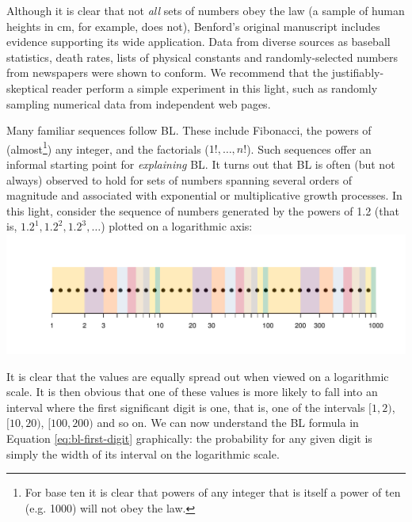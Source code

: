 \documentclass[twoside,leqno,twocolumn]{article}\usepackage[]{graphicx}\usepackage[]{color}
\makeatletter
\def\maxwidth{ %
  \ifdim\Gin@nat@width>\linewidth
    \linewidth
  \else
    \Gin@nat@width
  \fi
}
\newenvironment{knitrout}{}{} %
\makeatother
\begin{document}
Although it is clear that not \textit{all} sets of numbers obey the law (a sample of human heights in cm, for example, does not), Benford's original manuscript \cite{benford1938law} includes evidence supporting its wide application. Data from diverse sources as baseball statistics, death rates, lists of physical constants and randomly-selected numbers from newspapers were shown to conform. We recommend that the justifiably-skeptical reader perform a simple experiment in this light, such as randomly sampling numerical data from independent web pages.

Many familiar sequences follow BL. These include Fibonacci, the powers of (almost\footnote{For base ten it is clear that powers of any integer that is itself a power of ten (e.g. 1000) will not obey the law.}) any integer, and the factorials ($1!, \ldots, n!$). Such sequences offer an informal starting point for \textit{explaining} BL. It turns out that BL is often (but not always) observed to hold for sets of numbers spanning several orders of magnitude and associated with exponential or multiplicative growth processes. In this light, consider the sequence of numbers generated by the powers of 1.2 (that is, $1.2^1,1.2^2,1.2^3,\ldots$) plotted on a logarithmic axis:
\noindent
\begin{knitrout}
\color{fgcolor}
\includegraphics[width=\maxwidth]{figure/log-powers-of-two-1} 

\end{knitrout}

It is clear that the values are equally spread out when viewed on a logarithmic scale. It is then obvious that one of these values is more likely to fall into an interval where the first significant digit is one, that is, one of the intervals $[1,2)$, $[10,20)$, $[100,200)$ and so on. We can now understand the BL formula in Equation \ref{eq:bl-first-digit} graphically: the probability for any given digit is simply the width of its interval on the logarithmic scale.
\end{document}
